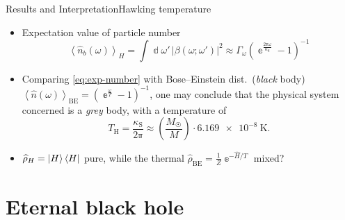 \documentclass{beamer}
\newcommand{\ee}{{\Bbbe}}
\newcommand{\pp}{{\Bbbpi}}
\newcommand{\rbr}[1]{{\left(#1\right)}}
\newcommand{\abr}[1]{{\left<#1\right>}}
\newcommand{\vbr}[1]{{\left|#1\right|}}
\newcommand{\rfun}[2]{{#1}\mathopen{}\left(#2\right)\mathclose{}}
\newcommand{\dif}{\Bbbd}
\newcommand{\what}[1]{{\widehat{#1}}}
\begin{document}
\begin{frame}{Results and Interpretation}{Hawking temperature}
\begin{itemize}
\item Expectation value of particle number 
\begin{equation}
\abr{\rfun{\what{n}_b}{\omega}}_H
= \int\dif\omega'\,\vbr{\rfun{\beta}{\omega;\omega'}}^2
 \approx \Gamma_\omega\rbr{\ee^\frac{2\pp\omega}{\kappa_\text{S}}-1}^{-1}
\label{eq:exp-number}
\end{equation}
\item Comparing \cref{eq:exp-number} with Bose--Einstein dist.\ (\emph{black}
body) $\abr{\rfun{\what{n}}{\omega}}_\text{BE} = \rbr{\ee^\frac{\omega}{T} -
1}^{-1}$, one may conclude that \alert<2>{the physical system concerned} is a
\emph{grey} body, with a temperature of
\[
T_\text{H} = \frac{\kappa_\text{S}}{2\pp}
\approx \rbr{\frac{M_\astrosun}{M}} \cdot \SI{6.169e-8}{\kelvin}.
\label{eq:Hawking-temp}
\]
\item<2> $\what{\rho}_H = \Ket{H}\Bra{H}$ \alert{pure},
while the thermal $\what{\rho}_\text{BE} = \frac{1}{Z} \ee^{-\what{H}/T}$ 
\alert{mixed}? 
\end{itemize}
\end{frame}

\section{Eternal black hole}
\end{document}
